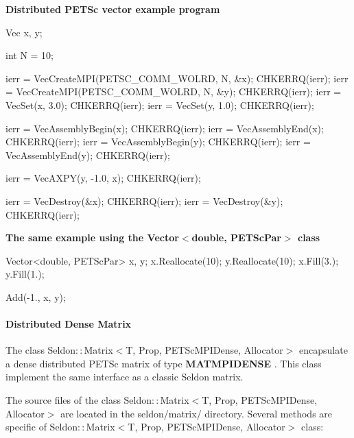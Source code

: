 \textbf{Distributed PETSc vector example program}


\begin{frame_cpp}

    Vec x, y;

    int N = 10;

    ierr = VecCreateMPI(PETSC_COMM_WOLRD, N, &x); CHKERRQ(ierr);
    ierr = VecCreateMPI(PETSC_COMM_WOLRD, N, &y); CHKERRQ(ierr);
    ierr = VecSet(x, 3.0); CHKERRQ(ierr);
    ierr = VecSet(y, 1.0); CHKERRQ(ierr);

    ierr = VecAssemblyBegin(x); CHKERRQ(ierr);
    ierr = VecAssemblyEnd(x); CHKERRQ(ierr);
    ierr = VecAssemblyBegin(y); CHKERRQ(ierr);
    ierr = VecAssemblyEnd(y); CHKERRQ(ierr);

    ierr = VecAXPY(y, -1.0, x); CHKERRQ(ierr);

    ierr = VecDestroy(&x); CHKERRQ(ierr);
    ierr = VecDestroy(&y); CHKERRQ(ierr);


\end{frame_cpp}


\textbf{The same example using the Vector$<$double, PETScPar$>$ class}

\begin{frame_cpp}

    Vector<double, PETScPar> x, y;
    x.Reallocate(10);
    y.Reallocate(10);
    x.Fill(3.);
    y.Fill(1.);

    Add(-1., x, y);

\end{frame_cpp}


\hypertarget{seq-par-ds-dmatrix}{}\paragraph{Distributed Dense Matrix}\label{seq-par-ds-dmatrix}


The class Seldon$::$Matrix$<$T, Prop, PETScMPIDense, Allocator$>$  encapsulate a  dense distributed PETSc matrix of type \textbf{MATMPIDENSE} . This class implement the same interface as a classic Seldon matrix.

The source files of the class Seldon$::$Matrix$<$T, Prop, PETScMPIDense, Allocator$>$   are located in the seldon/matrix/ directory. Several methods are specific of  Seldon$::$Matrix$<$T, Prop, PETScMPIDense, Allocator$>$  class:


